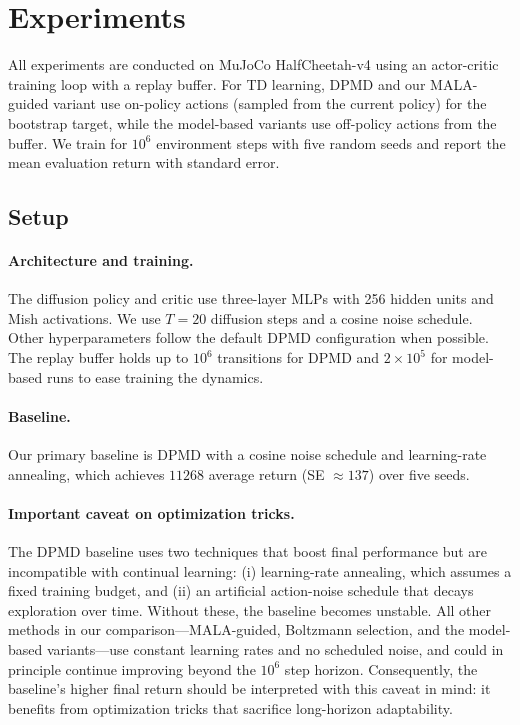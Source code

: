 \documentclass{article}
\theoremstyle{plain}
\theoremstyle{definition}
\theoremstyle{remark}
\begin{document}
\section{Experiments}
\label{sec:experiments}

All experiments are conducted on MuJoCo HalfCheetah-v4 using an actor-critic training loop with a replay buffer. For TD learning, DPMD and our MALA-guided variant use on-policy actions (sampled from the current policy) for the bootstrap target, while the model-based variants use off-policy actions from the buffer.
We train for $10^6$ environment steps with five random seeds and report the mean evaluation return with standard error.

\subsection{Setup}

\paragraph{Architecture and training.}
The diffusion policy and critic use three-layer MLPs with 256 hidden units and Mish activations.
We use $T=20$ diffusion steps and a cosine noise schedule. Other hyperparameters follow the default DPMD configuration when possible.
The replay buffer holds up to $10^6$ transitions for DPMD and $2\times 10^5$ for model-based runs to ease training the dynamics.

\paragraph{Baseline.}
Our primary baseline is DPMD with a cosine noise schedule and learning-rate annealing, which achieves $11268$ average return (SE $\approx 137$) over five seeds.

\paragraph{Important caveat on optimization tricks.}
\label{sec:lr-caveat}
The DPMD baseline uses two techniques that boost final performance but are incompatible with continual learning: (i) learning-rate annealing, which assumes a fixed training budget, and (ii) an artificial action-noise schedule that decays exploration over time.
Without these, the baseline becomes unstable.
All other methods in our comparison---MALA-guided, Boltzmann selection, and the model-based variants---use constant learning rates and no scheduled noise, and could in principle continue improving beyond the $10^6$ step horizon.
Consequently, the baseline's higher final return should be interpreted with this caveat in mind: it benefits from optimization tricks that sacrifice long-horizon adaptability.
\end{document}
